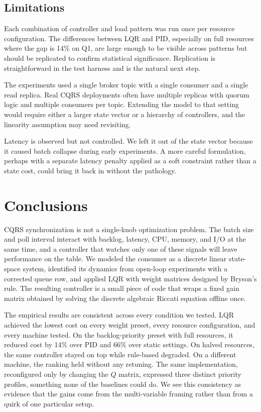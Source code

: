 \documentclass[10pt,a4paper]{article}
\begin{document}
\subsection{Limitations}

Each combination of controller and load pattern was run once per resource configuration. The differences between LQR and PID, especially on full resources where the gap is 14\% on Q1, are large enough to be visible across patterns but should be replicated to confirm statistical significance. Replication is straightforward in the test harness and is the natural next step.

The experiments used a single broker topic with a single consumer and a single read replica. Real CQRS deployments often have multiple replicas with quorum logic and multiple consumers per topic. Extending the model to that setting would require either a larger state vector or a hierarchy of controllers, and the linearity assumption may need revisiting.

Latency is observed but not controlled. We left it out of the state vector because it caused batch collapse during early experiments. A more careful formulation, perhaps with a separate latency penalty applied as a soft constraint rather than a state cost, could bring it back in without the pathology.

\section{Conclusions}

CQRS synchronization is not a single-knob optimization problem. The batch size and poll interval interact with backlog, latency, CPU, memory, and I/O at the same time, and a controller that watches only one of these signals will leave performance on the table. We modeled the consumer as a discrete linear state-space system, identified its dynamics from open-loop experiments with a corrected queue row, and applied LQR with weight matrices designed by Bryson's rule. The resulting controller is a small piece of code that wraps a fixed gain matrix obtained by solving the discrete algebraic Riccati equation offline once.

The empirical results are consistent across every condition we tested. LQR achieved the lowest cost on every weight preset, every resource configuration, and every machine tested. On the backlog-priority preset with full resources, it reduced cost by 14\% over PID and 66\% over static settings. On halved resources, the same controller stayed on top while rule-based degraded. On a different machine, the ranking held without any retuning. The same implementation, reconfigured only by changing the $Q$ matrix, expressed three distinct priority profiles, something none of the baselines could do. We see this consistency as evidence that the gains come from the multi-variable framing rather than from a quirk of one particular setup.
\end{document}
